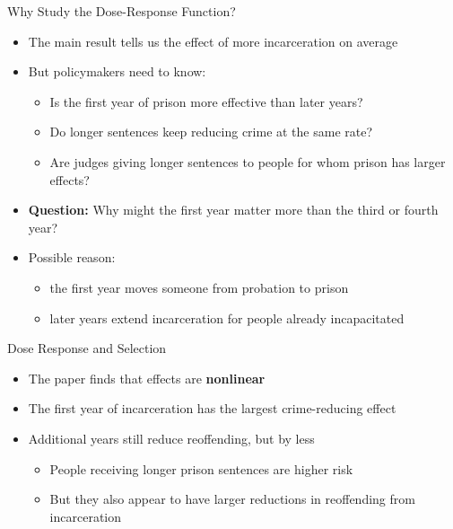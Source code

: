 \documentclass[11pt,notes=hide,aspectratio=169,mathserif]{beamer}
\begin{document}
\begin{frame}{Why Study the Dose-Response Function?}
\begin{itemize}
\item The main result tells us the effect of more incarceration on average
\pause \item But policymakers need to know:
\begin{itemize}
\item Is the first year of prison more effective than later years?
\item Do longer sentences keep reducing crime at the same rate?
\item Are judges giving longer sentences to people for whom prison has larger effects?
\end{itemize}
\pause \item \textbf{Question:} Why might the first year matter more than the third or fourth year?
\pause \item Possible reason:
\begin{itemize}
\item the first year moves someone from probation to prison
\item later years extend incarceration for people already incapacitated
\end{itemize}
\end{itemize}
\end{frame}

\begin{frame}{Dose Response and Selection}
\begin{itemize}
\item The paper finds that effects are \textbf{nonlinear}
\pause \item The first year of incarceration has the largest crime-reducing effect
\pause \item Additional years still reduce reoffending, but by less
\begin{itemize}
\item People receiving longer prison sentences are higher risk
\item But they also appear to have larger reductions in reoffending from incarceration
\end{itemize}
\end{itemize}
\end{frame}
\end{document}
